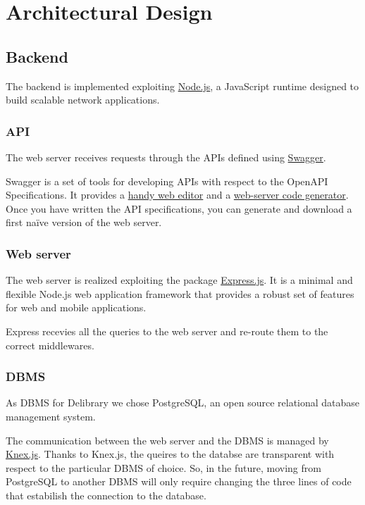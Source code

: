 \chapter{Architectural Design}

\section{Backend}
The backend is implemented exploiting \href{https://nodejs.org}{Node.js}, a JavaScript runtime designed to build scalable network applications.

\subsection{API}
The web server receives requests through the APIs defined using \href{https://swagger.io}{Swagger}.

Swagger is a set of tools for developing APIs with respect to the OpenAPI Specifications.
It provides a \href{https://editor.swagger.io}{handy web editor} and a \href{https://swagger.io/tools/swagger-codegen}{web-server code generator}.
Once you have written the API specifications, you can generate and download a first naïve version of the web server.

\subsection{Web server}
The web server is realized exploiting the package \href{https://expressjs.com}{Express.js}.
It is a minimal and flexible Node.js web application framework that provides a robust set of features for web and mobile applications.

Express recevies all the queries to the web server and re-route them to the correct middlewares.

\subsection{DBMS}
As DBMS for Delibrary we chose PostgreSQL, an open source relational database management system.

The communication between the web server and the DBMS is managed by \href{https://knexjs.org}{Knex.js}.
Thanks to Knex.js, the queires to the databse are transparent with respect to the particular DBMS of choice.
So, in the future, moving from PostgreSQL to another DBMS will only require changing the three lines of code that estabilish the connection to the database.

